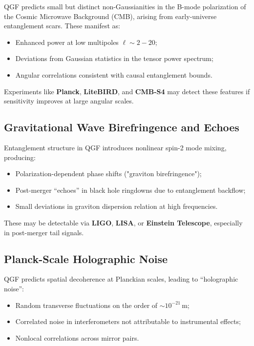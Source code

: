 \documentclass[11pt]{article}
\begin{document}
QGF predicts small but distinct non-Gaussianities in the B-mode polarization of the Cosmic Microwave Background (CMB), arising from early-universe entanglement scars. These manifest as:
\begin{itemize}
    \item Enhanced power at low multipoles \( \ell \sim 2 - 20 \);
    \item Deviations from Gaussian statistics in the tensor power spectrum;
    \item Angular correlations consistent with causal entanglement bounds.
\end{itemize}

Experiments like \textbf{Planck}, \textbf{LiteBIRD}, and \textbf{CMB-S4} may detect these features if sensitivity improves at large angular scales.

\subsection{Gravitational Wave Birefringence and Echoes}

Entanglement structure in QGF introduces nonlinear spin-2 mode mixing, producing:
\begin{itemize}
    \item Polarization-dependent phase shifts ("graviton birefringence");
    \item Post-merger “echoes” in black hole ringdowns due to entanglement backflow;
    \item Small deviations in graviton dispersion relation at high frequencies.
\end{itemize}

These may be detectable via \textbf{LIGO}, \textbf{LISA}, or \textbf{Einstein Telescope}, especially in post-merger tail signals.

\subsection{Planck-Scale Holographic Noise}

QGF predicts spatial decoherence at Planckian scales, leading to “holographic noise”:
\begin{itemize}
    \item Random transverse fluctuations on the order of \( \sim 10^{-21} \, \text{m} \);
    \item Correlated noise in interferometers not attributable to instrumental effects;
    \item Nonlocal correlations across mirror pairs.
\end{itemize}
\end{document}
